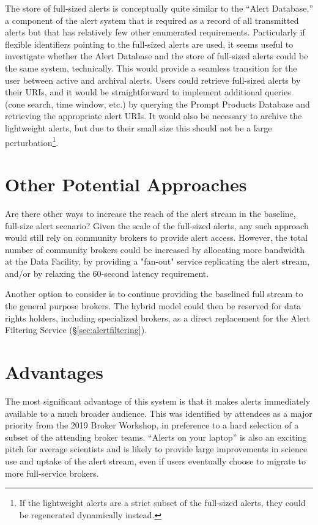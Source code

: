 \documentclass[DM,authoryear,toc]{lsstdoc}
\begin{document}
The store of full-sized alerts is conceptually quite similar to the ``Alert Database,'' a component of the alert system that is required as a record of all transmitted alerts but that has relatively few other enumerated requirements.
Particularly if flexible identifiers pointing to the full-sized alerts are used, it seems useful to investigate whether the Alert Database and the store of full-sized alerts could be the same system, technically.
This would provide a seamless transition for the user between active and archival alerts.
Users could retrieve full-sized alerts by their URIs, and it would be straightforward to implement additional queries (cone search, time window, etc.) by querying the Prompt Products Database and retrieving the appropriate alert URIs.
It would also be necessary to archive the lightweight alerts, but due to their small size this should not be a large perturbation\footnote{If the lightweight alerts are a strict subset of the full-sized alerts, they could be regenerated dynamically instead.}.

\section{Other Potential Approaches} \label{sec:alerternatives}

Are there other ways to increase the reach of the alert stream in the baseline, full-size alert scenario?
Given the scale of the full-sized alerts, any such approach would still rely on community brokers to provide alert access.
However, the total number of community brokers could be increased by allocating more bandwidth at the Data Facility, by providing a "fan-out" service replicating the alert stream, and/or by relaxing the 60-second latency requirement.

Another option to consider is to continue providing the baselined full stream to the general purpose brokers.
The hybrid model could then be reserved for data rights holders, including specialized brokers, as a direct replacement for the Alert Filtering Service (\S \ref{sec:alertfiltering}).

\section{Advantages}

The most significant advantage of this system is that it makes alerts immediately available to a much broader audience.
This was identified by attendees as a major priority from the 2019 Broker Workshop, in preference to a hard selection of a subset of the attending broker teams.
``Alerts on your laptop'' is also an exciting pitch for average scientists and is likely to provide large improvements in science use and uptake of the alert stream, even if users eventually choose to migrate to more full-service brokers.
\end{document}
